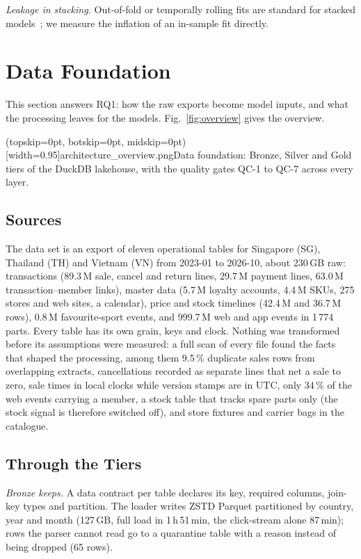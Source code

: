\documentclass{ieeeaccess}
\begin{document}
\textit{Leakage in stacking.} Out-of-fold or temporally rolling fits are standard for stacked models~\cite{wolpert1992stacking}; we
measure the inflation of an in-sample fit directly.

\section{Data Foundation}
\label{sec:data}

This section answers RQ1: how the raw exports become model inputs, and what the processing leaves for the models.
Fig.~\ref{fig:overview} gives the overview.

\Figure[t!](topskip=0pt, botskip=0pt, midskip=0pt)[width=0.95\textwidth]{architecture_overview.png}{Data foundation: Bronze, Silver and Gold tiers of the DuckDB lakehouse, with the quality gates QC-1 to QC-7 across every layer.\label{fig:overview}}

\subsection{Sources}
The data set is an export of eleven operational tables for Singapore (SG), Thailand (TH) and Vietnam (VN) from 2023-01 to 2026-10,
about 230\,GB raw: transactions (89.3\,M sale, cancel and return lines, 29.7\,M payment lines, 63.0\,M transaction--member links),
master data (5.7\,M loyalty accounts, 4.4\,M SKUs, 275 stores and web sites, a calendar), price and stock timelines (42.4\,M and
36.7\,M rows), 0.8\,M favourite-sport events, and 999.7\,M web and app events in 1\,774 parts. Every table has its own grain, keys and
clock. Nothing was transformed before its assumptions were measured: a full scan of every file found the facts that shaped the
processing, among them 9.5\,\% duplicate sales rows from overlapping extracts, cancellations recorded as separate lines that net a sale
to zero, sale times in local clocks while version stamps are in UTC, only 34\,\% of the web events carrying a member, a stock table
that tracks spare parts only (the stock signal is therefore switched off), and store fixtures and carrier bags in the catalogue.

\subsection{Through the Tiers}
\textit{Bronze keeps.} A data contract per table declares its key, required columns, join-key types and partition. The loader writes
ZSTD Parquet partitioned by country, year and month (127\,GB, full load in 1\,h\,51\,min, the click-stream alone 87\,min); rows the
parser cannot read go to a quarantine table with a reason instead of being dropped (65 rows).
\end{document}
